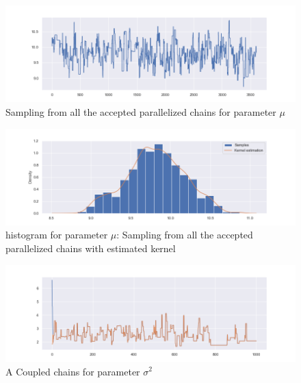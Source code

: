 \documentclass {article}
\begin{document}
\begin{figure}[h!]
	\centering
	\includegraphics[width=\textwidth]{doublecoupling_pack/doublecoupling_sampling_mu}
	\caption{Sampling from all the accepted parallelized chains for parameter $\mu$ }   %
	\label{muallsampledouble}
\end{figure}



\begin{figure}[h!]
	\centering
	\includegraphics[width=\textwidth]{doublecoupling_pack/doublecoupling_mu_histogram_kernel}
	\caption{histogram for parameter $\mu$: Sampling from all the accepted parallelized chains with estimated kernel}   %
	\label{muhistdouble}
\end{figure}




\begin{figure}[h!]
	\centering
	\includegraphics[width=\textwidth]{doublecoupling_pack/doublecoupling_sigma_chain_meeting}
	\caption{A Coupled chains for parameter $\sigma^2$ }   %
	\label{sigmachainsdouble}
\end{figure}
\end{document}
